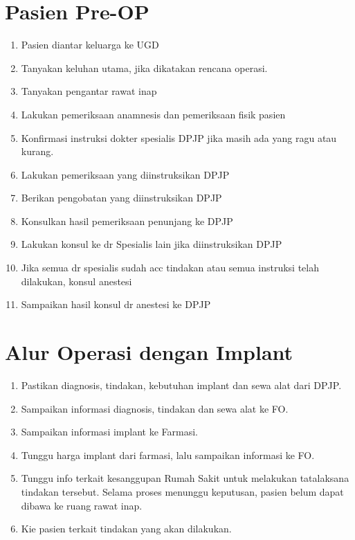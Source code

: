 \documentclass[
]{book}
\providecommand{\tightlist}{%
  \setlength{\itemsep}{0pt}\setlength{\parskip}{0pt}}
\begin{document}
\hypertarget{pasien-pre-op}{%
\section{Pasien Pre-OP}\label{pasien-pre-op}}

\begin{enumerate}
\def\labelenumi{\arabic{enumi}.}
\tightlist
\item
  Pasien diantar keluarga ke UGD
\item
  Tanyakan keluhan utama, jika dikatakan rencana operasi.
\item
  Tanyakan pengantar rawat inap
\item
  Lakukan pemeriksaan anamnesis dan pemeriksaan fisik pasien
\item
  Konfirmasi instruksi dokter spesialis DPJP jika masih ada yang ragu atau kurang.
\item
  Lakukan pemeriksaan yang diinstruksikan DPJP
\item
  Berikan pengobatan yang diinstruksikan DPJP
\item
  Konsulkan hasil pemeriksaan penunjang ke DPJP
\item
  Lakukan konsul ke dr Spesialis lain jika diinstruksikan DPJP
\item
  Jika semua dr spesialis sudah acc tindakan atau semua instruksi telah dilakukan, konsul anestesi
\item
  Sampaikan hasil konsul dr anestesi ke DPJP
\end{enumerate}

\hypertarget{alur-operasi-dengan-implant}{%
\section{Alur Operasi dengan Implant}\label{alur-operasi-dengan-implant}}

\begin{enumerate}
\def\labelenumi{\arabic{enumi}.}
\tightlist
\item
  Pastikan diagnosis, tindakan, kebutuhan implant dan sewa alat dari DPJP.
\item
  Sampaikan informasi diagnosis, tindakan dan sewa alat ke FO.
\item
  Sampaikan informasi implant ke Farmasi.
\item
  Tunggu harga implant dari farmasi, lalu sampaikan informasi ke FO.
\item
  Tunggu info terkait kesanggupan Rumah Sakit untuk melakukan tatalaksana tindakan tersebut. Selama proses menunggu keputusan, pasien belum dapat dibawa ke ruang rawat inap.
\item
  Kie pasien terkait tindakan yang akan dilakukan.
\end{enumerate}
\end{document}
